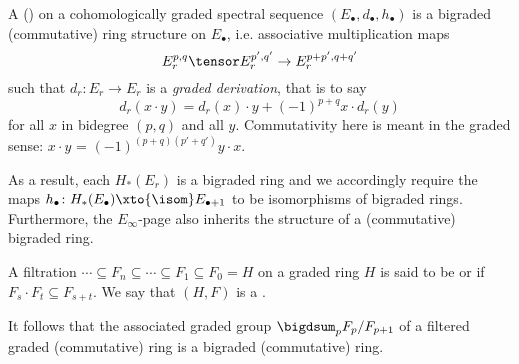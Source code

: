 \begin{definition}
	A ()  on a cohomologically graded spectral sequence $(E_\bullet, d_\bullet, h_\bullet)$ is a bigraded (commutative) ring structure on $E_\bullet$, i.e. associative multiplication maps
	\begin{equation*}
		E_r^{p, q} \tensor E_r^{p', q'} \to E_r^{p + p', q + q'}
	\end{equation*}
	such that $d_r\colon E_r \to E_r$ is a \emph{graded derivation}, that is to say
	\begin{equation*}
		d_r(x \cdot y) = d_r(x) \cdot y + (-1)^{p + q} x \cdot d_r(y)
	\end{equation*}
	for all $x$ in bidegree $(p, q)$ and all $y$.
	Commutativity here is meant in the graded sense: $x \cdot y$ = $(-1)^{(p + q)(p' + q')} y \cdot x$.

	As a result, each $H_*(E_r)$ is a bigraded ring and we accordingly require the maps $h_\bullet\colon H_*(E_\bullet) \xto{\isom} E_{\bullet + 1}$ to be isomorphisms of bigraded rings.
	Furthermore, the $E_\infty$-page also inherits the structure of a (commutative) bigraded ring.
\end{definition}
\begin{definition}
	A filtration $\cdots \subseteq F_n \subseteq \cdots \subseteq F_1 \subseteq F_0 = H$ on a graded ring $H$ is said to be  or  if $F_s \cdot F_t \subseteq F_{s + t}$.
	We say that $(H, F)$ is a .
\end{definition}
It follows that the associated graded group $\bigdsum_p F_p / F_{p + 1}$ of a filtered graded (commutative) ring is a bigraded (commutative) ring.

